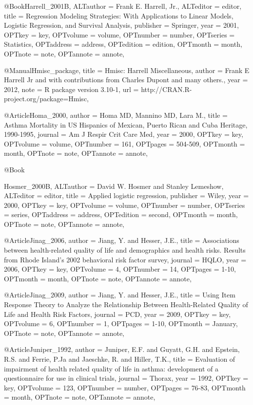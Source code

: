 {{@Book{Harrell_2001B,
ALTauthor = {{Frank E. Harrell, Jr.}},
ALTeditor = {editor},
title = {Regression Modeling Strategies: With Applications to Linear Models, Logistic Regression, and Survival Analysis},
publisher = {Springer},
year = {2001},
OPTkey = {key},
OPTvolume = {volume},
OPTnumber = {number},
OPTseries = {Statistics},
OPTaddress = {address},
OPTedition = {edition},
OPTmonth = {month},
OPTnote = {note},
OPTannote = {annote},
}


@Manual{Hmisc_package,
    title = {Hmisc: Harrell Miscellaneous},
    author = {Frank E Harrell Jr and with contributions from Charles Dupont and many others.},
    year = {2012},
    note = {R package version 3.10-1},
    url = {http://CRAN.R-project.org/package=Hmisc},
  }


@Article{Homa_2000,
author = {Homa MD, Mannino MD, Lara M.},
title = {Asthma Mortality in US Hispanics of Mexican, Puerto Rican and Cuba Heritage, 1990-1995},
journal = {Am J Respir Crit Care Med},
year = {2000},
OPTkey = {key},
OPTvolume = {volume},
OPTnumber = {161},
OPTpages = {504-509},
OPTmonth = {month},
OPTnote = {note},
OPTannote = {annote},
}


@Book{Hosmer_2000B,
ALTauthor = {{David W. Hosmer} and {{Stanley Lemeshow}},
ALTeditor = {editor},
title = {Applied logistic regression},
publisher = {Wiley},
year = {2000},
OPTkey = {key},
OPTvolume = {volume},
OPTnumber = {number},
OPTseries = {series},
OPTaddress = {address},
OPTedition = {second},
OPTmonth = {month},
OPTnote = {note},
OPTannote = {annote},
}



@Article{Jinag_2006,
author = {Jiang, Y. and Hesser, J.E.},
title = {Associations between health-related quality of life and demographics and health risks. Results from Rhode Island's 2002 behavioral risk factor survey},
journal = {HQLO},
year = {2006},
OPTkey = {key},
OPTvolume = {4},
OPTnumber = {14},
OPTpages = {1-10},
OPTmonth = {month},
OPTnote = {note},
OPTannote = {annote},
}


@Article{Jinag_2009,
author = {Jiang, Y. and Hesser, J.E.},
title = {Using Item Response Theory to Analyze the Relationship Between Health-Related Quality of Life and Health Risk Factors},
journal = {PCD},
year = {2009},
OPTkey = {key},
OPTvolume = {6},
OPTnumber = {1},
OPTpages = {1-10},
OPTmonth = {January},
OPTnote = {note},
OPTannote = {annote},
}

@Article{Juniper_1992,
author = {Juniper, E.F. and Guyatt, G.H. and Epstein, R.S. and Ferrie, P.Ja and Jaeschke, R. and Hiller, T.K.},
title = {Evaluation of impairment of health related quality of life in asthma: development of a questionnaire for use in clinical trials},
journal = {Thorax},
year = {1992},
OPTkey = {key},
OPTvolume = {123},
OPTnumber = {number},
OPTpages = {76-83},
OPTmonth = {month},
OPTnote = {note},
OPTannote = {annote},
}

}}}
